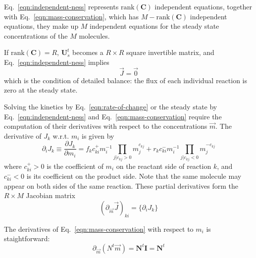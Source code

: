 \documentclass[aps,groupedaddress]{revtex4}
\newcommand*{\mat}[1]{\mathbf{#1}}
\newcommand*{\rank}[1]{\mathrm{rank}({#1})}
\begin{document}
Eq.~\ref{eqn:independent-ness} represents $\rank{\mat{C}}$ independent
equations, together with Eq.~\ref{eqn:mass-conservation}, which has
$M-\rank{\mat{C}}$ independent equations, they make up $M$ independent
equations for the steady state concentrations of the $M$ molecules.

If $\rank{\mat{C}} = R$, $\mat{U}_s^t$ becomes a $R\times R$ square invertible
matrix, and Eq.~\ref{eqn:independent-ness} implies
\begin{equation}
\vec{J} = \vec{0}
\label{eqn:detailed-balance}
\end{equation}
which is the condition of detailed balance: the flux of each
individual reaction is zero at the steady state.

Solving the kinetics by Eq.~\ref{eqn:rate-of-change} or the steady state
by Eq.~\ref{eqn:independent-ness} and Eq.~\ref{eqn:mass-conservation}
require the computation of their derivatives with respect to the
concentrations $\vec{m}$.  The derivative of $J_k$ w.r.t. $m_i$ is given by
\begin{equation}
\partial_i J_k \equiv \frac{\partial J_k}{\partial m_i}
= f_k c_{ki}^{+} m_i^{-1} \prod_{j|c_{kj}>0} m_j^{c_{kj}} + r_k c_{ki}^{-} m_i^{-1} \prod_{j|c_{kj}<0} m_j^{-c_{kj}}
\end{equation}
where $c_{ki}^{+} > 0$ is the coefficient of $m_i$ on the reactant
side of reaction $k$, and $c_{ki}^{-} < 0$ is its coefficient on the
product side.  Note that the same molecule may appear on both sides of the
same reaction.  These partial derivatives form the $R\times M$ Jacobian matrix 
\begin{equation}
(\partial_{\vec{m}} \vec{J})_{ki} = \{ \partial_i J_k \}
\end{equation}

The derivatives of Eq.~\ref{eqn:mass-conservation} with respect to $m_i$ is 
staightforward:
\begin{equation}
\partial_{\vec{m}} \left(N^t \vec{m}\right) = \mat{N}^t \mat{I} = \mat{N}^t
\end{equation}
\end{document}
